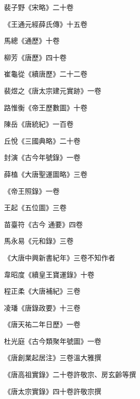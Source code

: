 \begin{pinyinscope}
 裴子野《宋略》二十卷



 《王通元經薛氏傳》十五卷



 馬總《通歷》十卷



 柳芳《唐歷》四十卷



 崔龜從《續唐歷》二十二卷



 裴煜之《唐太宗建元實跡》一卷



 路惟衡《帝王歷數圖》十卷



 陳岳《唐統紀》一百卷



 丘悅《三國典略》二十卷



 封演《古今年號錄》一卷



 薛榼《大唐聖運圖略》三卷



 《帝王照錄》一卷



 王起《五位圖》三卷



 苗臺符《古今
 通要》四卷



 馬永易《元和錄》三卷



 《大唐中興新書紀年》三卷不知作者



 韋昭度《續皇王寶運錄》十卷



 程正柔《大唐補紀》三卷



 凌璠《唐錄政要》十三卷



 《唐天祐二年日歷》一卷



 杜光庭《古今類聚年號圖》一卷



 《唐創業起居注》三卷溫大雅撰



 《唐高祖實錄》二十卷許敬宗、房玄齡等撰



 《唐太宗實錄》四十卷許敬宗撰




\end{pinyinscope}

